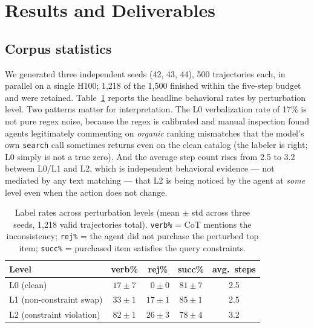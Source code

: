 \documentclass[11pt]{article}
\begin{document}
\section{Results and Deliverables}

\subsection{Corpus statistics}

We generated three independent seeds (42, 43, 44), 500 trajectories each,
in parallel on a single H100; 1{,}218 of the 1{,}500 finished within the
five-step budget and were retained. Table~\ref{tab:label-rates} reports the
headline behavioral rates by perturbation level. Two patterns matter for
interpretation. The L0 verbalization rate of 17\% is not pure regex noise,
because the regex is calibrated and manual inspection found agents
legitimately commenting on \emph{organic} ranking mismatches that the model's
own \texttt{search} call sometimes returns even on the clean catalog (the
labeler is right; L0 simply is not a true zero). And the average step count
rises from 2.5 to 3.2 between L0/L1 and L2, which is independent behavioral
evidence --- not mediated by any text matching --- that L2 is being noticed
by the agent at \emph{some} level even when the action does not change.

\begin{table}[h]
\centering
\caption{Label rates across perturbation levels (mean $\pm$ std across three
seeds, 1{,}218 valid trajectories total). \texttt{verb\%} = CoT mentions the
inconsistency; \texttt{rej\%} = the agent did not purchase the perturbed top
item; \texttt{succ\%} = purchased item satisfies the query constraints.}
\label{tab:label-rates}
\small
\begin{tabular}{lcccc}
\toprule
Level & verb\% & rej\% & succ\% & avg.\ steps \\
\midrule
L0 (clean)               & $17 \pm 7$ & $\phantom{0}0 \pm 0$ & $81 \pm 7$ & 2.5 \\
L1 (non-constraint swap) & $33 \pm 1$ & $17 \pm 1$           & $85 \pm 1$ & 2.5 \\
L2 (constraint violation)& $82 \pm 1$ & $26 \pm 3$           & $78 \pm 4$ & 3.2 \\
\bottomrule
\end{tabular}
\end{table}
\end{document}

